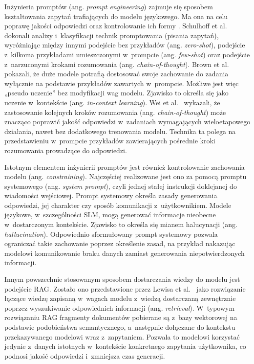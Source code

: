 Inżynieria promptów (ang. \emph{prompt engineering}) zajmuje się sposobem kształtowania zapytań trafiających do modelu językowego. Ma ona na celu poprawę jakości odpowiedzi oraz kontrolowanie ich formy \cite{Schulhoff2024}. Schulhoff et al. dokonali analizy i~klasyfikacji technik promptowania (pisania zapytań), wyróżniając między innymi podejście bez przykładów (ang. \emph{zero-shot}), podejście z~kilkoma przykładami umieszczonymi w~prompcie (ang. \emph{few-shot}) oraz podejście z~narzuconymi krokami rozumowania (ang. \emph{chain-of-thought}). Brown et al.~\cite{Brown2020} pokazali, że duże modele potrafią dostosować swoje zachowanie do zadania wyłącznie na podstawie przykładów zawartych w~prompcie. Możliwe jest więc „pseudo uczenie” bez modyfikacji wag modelu. Zjawisko to określa się jako uczenie w~kontekście (ang. \emph{in-context learning}). Wei et al.~\cite{Wei2022} wykazali, że zastosowanie kolejnych kroków rozumowania (ang. \emph{chain-of-thought}) może znacząco poprawić jakość odpowiedzi w~zadaniach wymagających wieloetapowego działania, nawet bez dodatkowego trenowania modelu. Technika ta polega na przedstawieniu w~prompcie przykładów zawierających pośrednie kroki rozumowania prowadzące do odpowiedzi.

Istotnym elementem inżynierii promptów jest również kontrolowanie zachowania modelu (ang. \emph{constraining}). Najczęściej realizowane jest ono za pomocą promptu systemowego (ang. \emph{system prompt}), czyli jednej stałej instrukcji doklejanej do wiadomości wejściowej. Prompt systemowy określa zasady generowania odpowiedzi, jej charakter czy sposób komunikacji z~użytkownikiem. Modele językowe, w~szczególności SLM, mogą generować informacje nieobecne w~dostarczonym kontekście. Zjawisko to określa się mianem halucynacji (ang. \emph{hallucination}). Odpowiednio sformułowany prompt systemowy pozwala ograniczać takie zachowanie poprzez określenie zasad, na przykład nakazując modelowi komunikowanie braku danych zamiast generowania niepotwierdzonych informacji.

Innym powszechnie stosowanym sposobem dostarczania wiedzy do modelu jest podejście RAG. Zostało ono przedstawione przez Lewisa et al.~\cite{Lewis2020} jako rozwiązanie łączące wiedzę zapisaną w~wagach modelu z~wiedzą dostarczaną zewnętrznie poprzez wyszukiwanie odpowiednich informacji (ang. \emph{retrieval}). W~typowym rozwiązaniu RAG fragmenty dokumentów pobierane są z~bazy wektorowej na podstawie podobieństwa semantycznego, a~następnie dołączane do kontekstu przekazywanego modelowi wraz z~zapytaniem. Pozwala to modelowi korzystać jedynie z~danych istotnych w~kontekście konkretnego zapytania użytkownika, co podnosi jakość odpowiedzi i~zmniejsza czas generacji.

